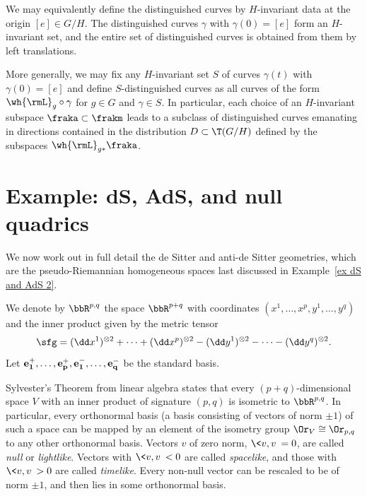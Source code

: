 \begin{rem}
    We may equivalently define the distinguished curves by $H$-invariant data at the origin $[e]\in G\slash H$. The distinguished curves $\gamma$ with $\gamma(0)=[e]$ form an $H$-invariant set, and the entire set of distinguished curves is obtained from them by left translations.

    More generally, we may fix any $H$-invariant set $S$ of curves $\gamma(t)$ with $\gamma(0)=[e]$ and define $S$-distinguished curves as all curves of the form $\wh{\rmL}_g\circ\gamma$ for $g\in G$ and $\gamma\in S$. In particular, each choice of an $H$-invariant subspace $\fraka\subset\frakm$ leads to a subclass of distinguished curves emanating in directions contained in the distribution $D\subset \T(G\slash H)$ defined by the subspaces $\wh{\rmL}_{g\ast}\fraka$.
\end{rem}








\section{Example: dS, AdS, and null quadrics}\label{sec: dS and AdS}


We now work out in full detail the de Sitter and anti-de Sitter geometries, which are the pseudo-Riemannian homogeneous spaces last discussed in Example~\ref{ex dS and AdS 2}.

We denote by $\bbR^{p,q}$ the space $\bbR^{p+q}$ with coordinates $(x^1,\ldots,x^p,y^1,\ldots,y^q)$ and the inner product given by the metric tensor 
\[\sfg=(\dd x^1)^{\otimes 2}+\cdots +(\dd x^p)^{\otimes 2}-(\dd y^1)^{\otimes 2}-\cdots -(\dd y^q)^{\otimes 2}.\]
Let $\bf{e}_1^+,\ldots,\bf{e}_p^+,\bf{e}_1^-,\ldots,\bf{e}_q^-$ be the standard basis. 

Sylvester's Theorem from linear algebra states that every $(p+q)$-dimensional space $V$ with an inner product of signature $(p,q)$ is isometric to $\bbR^{p,q}$. In particular, every orthonormal basis (a basis consisting of vectors of norm $\pm 1$) of such a space can be mapped by an element of the isometry group $\Or_V\cong \Or_{p,q}$ to any other orthonormal basis. Vectors $v$ of zero norm, $\<v,v\>=0$, are called \emph{null} or \emph{lightlike}. Vectors with $\<v,v\><0$ are called \emph{spacelike}, and those with $\<v,v\>>0$ are called \emph{timelike}.  Every non-null vector can be rescaled to be of norm $\pm 1$, and then lies in some orthonormal basis.

